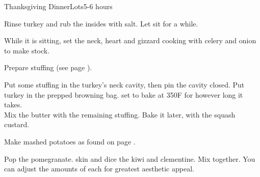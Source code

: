 \documentclass[../Cookbook.tex]{subfiles}
\begin{document}
\begin{recipe}{Thanksgiving Dinner}{Lots}{5-6 hours}

Rinse turkey and rub the insides with salt. Let sit for a while.

While it is sitting, set the neck, heart and gizzard cooking with celery and onion to make stock.

Prepare stuffing (see page \pageref{Stuffing}).

Put some stuffing in the turkey's neck cavity, then pin the cavity closed. Put turkey in the prepped browning bag. set to bake at 350\0F for however long it takes.
\\

Mix the butter with the remaining stuffing. Bake it later, with the squash custard.

%

\newstep
Make mashed potatoes as found on page \pageref{MashedPotatoes}.


Pop the pomegranate. skin and dice the kiwi and clementine. Mix together. You can adjust the amounts of each for greatest aesthetic appeal.


\end{recipe}
\end{document}
